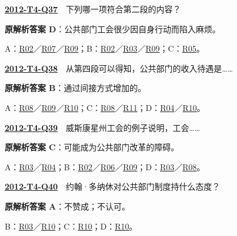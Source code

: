 \documentclass[11pt,a4paper]{article}
\begin{document}
\label{idx-2012-T4-Q37}\noindent\textbf{\href{https://zj139.github.io/math-notes/english/2567aa708876e7f62db07164/\#q37}{2012-T4-Q37}}　下列哪一项符合第二段的内容？\par\nopagebreak
\noindent\textbf{原解析答案 D}：公共部门工会很少因自身行动而陷入麻烦。\par\nopagebreak
\noindent A：\hyperref[cat-R02]{R02}／\hyperref[cat-R07]{R07}／\hyperref[cat-R09]{R09}；B：\hyperref[cat-R02]{R02}／\hyperref[cat-R03]{R03}／\hyperref[cat-R09]{R09}；C：\hyperref[cat-R05]{R05}。\par\smallskip
{}\label{idx-2012-T4-Q38}\noindent\textbf{\href{https://zj139.github.io/math-notes/english/2567aa708876e7f62db07164/\#q38}{2012-T4-Q38}}　从第四段可以得知，公共部门的收入待遇是……\par\nopagebreak
\noindent\textbf{原解析答案 B}：通过间接方式增加的。\par\nopagebreak
\noindent A：\hyperref[cat-R08]{R08}／\hyperref[cat-R09]{R09}／\hyperref[cat-R10]{R10}；C：\hyperref[cat-R08]{R08}／\hyperref[cat-R11]{R11}；D：\hyperref[cat-R04]{R04}／\hyperref[cat-R10]{R10}。\par\smallskip
{}\label{idx-2012-T4-Q39}\noindent\textbf{\href{https://zj139.github.io/math-notes/english/2567aa708876e7f62db07164/\#q39}{2012-T4-Q39}}　威斯康星州工会的例子说明，工会……\par\nopagebreak
\noindent\textbf{原解析答案 C}：可能成为公共部门改革的障碍。\par\nopagebreak
\noindent A：\hyperref[cat-R03]{R03}／\hyperref[cat-R04]{R04}；B：\hyperref[cat-R02]{R02}／\hyperref[cat-R06]{R06}／\hyperref[cat-R09]{R09}；D：\hyperref[cat-R03]{R03}／\hyperref[cat-R08]{R08}。\par\smallskip
{}\label{idx-2012-T4-Q40}\noindent\textbf{\href{https://zj139.github.io/math-notes/english/2567aa708876e7f62db07164/\#q40}{2012-T4-Q40}}　约翰·多纳休对公共部门制度持什么态度？\par\nopagebreak
\noindent\textbf{原解析答案 A}：不赞成；不认可。\par\nopagebreak
\noindent B：\hyperref[cat-R03]{R03}／\hyperref[cat-R10]{R10}；C：\hyperref[cat-R10]{R10}；D：\hyperref[cat-R10]{R10}。\par\smallskip
\clearpage
\end{document}
